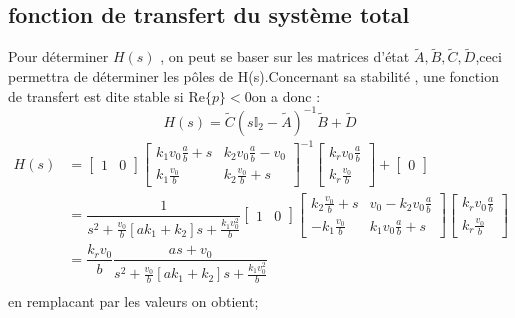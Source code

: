 \documentclass[11pt,a4paper]{article}
\begin{document}
\subsection{fonction de transfert du système total}
Pour déterminer $H(s)$ , on peut se baser sur les matrices d'état
$\tilde{A},\tilde{B},\tilde{C},\tilde{D}$,ceci permettra de déterminer les pôles de H(s).Concernant sa stabilité , une fonction de transfert est dite stable si $\mathrm {Re} \{ p\}<0$on a donc : \\
$$H(s)=\tilde{C} \left (s \mathbb{I} _2 - \tilde{A} \right)^{-1} \tilde{B} + \tilde{D} $$
\begin{align*}
	H(s) & = \begin{bmatrix} 1 & 0  \end{bmatrix} \begin{bmatrix}  k_1 v_0  \frac ab +s & k_2v_0  \frac ab - v_0 \\ k_1 \frac {v_0} b & k_2 \frac{v_0}b+s \end{bmatrix}^{-1}
	\begin{bmatrix} k_r v_0 \frac ab \\  k_r \frac{v_0}b \end{bmatrix} + \begin{bmatrix}  0  \end{bmatrix}                                                                                                                         \\
	     & =\dfrac{1}{s^2 + \frac{v_0}b [a k_1 + k_2]s + \frac{k_1 v_0 ^2}b} \begin{bmatrix} 1 & 0 \end{bmatrix} \begin{bmatrix}k_2 \frac{v_0}b+s & v_0 -k_2 v_0 \frac ab \\ - k_1 \frac{v_0}b & k_1 v_0 \frac ab +s \end{bmatrix}
	\begin{bmatrix} k_r v_0 \frac ab \\ k_r \frac {v_0}b \end{bmatrix}                                                                                                                                                             \\
	     & =\dfrac{k_r v_0}{b}\dfrac{as+v_0}{s^2 + \frac{v_0}b [a k_1 + k_2 ]s + \frac{k_1 v_0 ^2}b}                                                                                                                                \\
\end{align*}
 en remplacant par les valeurs on obtient;
\end{document}
